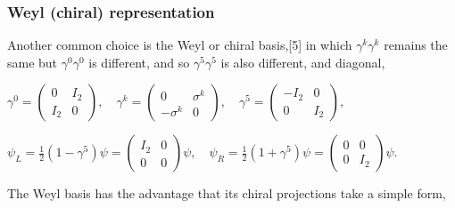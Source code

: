 \begin{frame}\frametitle{ Weyl (chiral) representation }
Another common choice is the Weyl or chiral basis,[5] in which ${\displaystyle \gamma ^{k}}\gamma ^{k}$ remains the same but ${\displaystyle \gamma ^{0}}\gamma ^{0}$ is different, and so ${\displaystyle \gamma ^{5}}\gamma ^{5}$ is also different, and diagonal,


$\gamma ^{0}={\begin{pmatrix}0&I_{2}\\I_{2}&0\end{pmatrix}},\quad \gamma ^{k}={\begin{pmatrix}0&\sigma ^{k}\\-\sigma ^{k}&0\end{pmatrix}},\quad \gamma ^{5}={\begin{pmatrix}-I_{2}&0\\0&I_{2}\end{pmatrix}},$


${\displaystyle \psi _{L}={\frac {1}{2}}\left(1-\gamma ^{5}\right)\psi ={\begin{pmatrix}I_{2}&0\\0&0\end{pmatrix}}\psi ,\quad \psi _{R}={\frac {1}{2}}\left(1+\gamma ^{5}\right)\psi ={\begin{pmatrix}0&0\\0&I_{2}\end{pmatrix}}\psi .}$

The Weyl basis has the advantage that its chiral projections take a simple form,




\end{frame}
